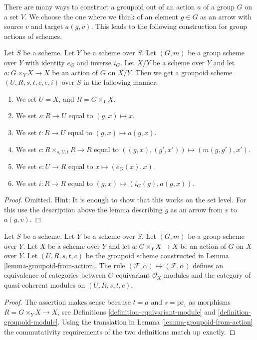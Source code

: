 \noindent
There are many ways to construct a groupoid out of an action $a$
of a group $G$ on a set $V$. We choose the one where we think
of an element $g \in G$ as an arrow with source $v$ and target $a(g, v)$.
This leads to the following construction for group actions of
schemes.

\begin{lemma}
\label{lemma-groupoid-from-action}
Let $S$ be a scheme.
Let $Y$ be a scheme over $S$.
Let $(G, m)$ be a group scheme over $Y$ with
identity $e_G$ and inverse $i_G$.
Let $X/Y$ be a scheme over $Y$ and let $a : G \times_Y X \to X$
be an action of $G$ on $X/Y$.
Then we get a groupoid scheme $(U, R, s, t, c, e, i)$ over $S$
in the following manner:
\begin{enumerate}
\item We set $U = X$, and $R = G \times_Y X$.
\item We set $s : R \to U$ equal to $(g, x) \mapsto x$.
\item We set $t : R \to U$ equal to $(g, x) \mapsto a(g, x)$.
\item We set $c : R \times_{s, U, t} R \to R$ equal to
$((g, x), (g', x')) \mapsto (m(g, g'), x')$.
\item We set $e : U \to R$ equal to $x \mapsto (e_G(x), x)$.
\item We set $i : R \to R$ equal to $(g, x) \mapsto (i_G(g), a(g, x))$.
\end{enumerate}
\end{lemma}

\begin{proof}
Omitted. Hint: It is enough to show that this works on the set
level. For this use the description above the lemma describing
$g$ as an arrow from $v$ to $a(g, v)$.
\end{proof}

\begin{lemma}
\label{lemma-action-groupoid-modules}
Let $S$ be a scheme.
Let $Y$ be a scheme over $S$.
Let $(G, m)$ be a group scheme over $Y$.
Let $X$ be a scheme over $Y$ and let $a : G \times_Y X \to X$
be an action of $G$ on $X$ over $Y$. Let $(U, R, s, t, c)$ be
the groupoid scheme constructed in Lemma \ref{lemma-groupoid-from-action}.
The rule
$(\mathcal{F}, \alpha) \mapsto (\mathcal{F}, \alpha)$ defines
an equivalence of categories between $G$-equivariant
$\mathcal{O}_X$-modules and the category of quasi-coherent
modules on $(U, R, s, t, c)$.
\end{lemma}

\begin{proof}
The assertion makes sense because $t = a$ and $s = \text{pr}_1$
as morphisms $R = G \times_Y X \to X$, see
Definitions \ref{definition-equivariant-module} and
\ref{definition-groupoid-module}.
Using the translation in Lemma \ref{lemma-groupoid-from-action}
the commutativity requirements
of the two definitions match up exactly.
\end{proof}





